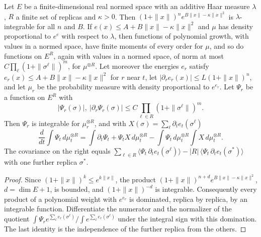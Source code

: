 \begin{lemma}\label{lem:sg-tal:st-confined}
  \leanok
Let $E$ be a finite-dimensional real normed space with an additive Haar measure $\lambda$, $R$ a finite set of
replicas and $\kappa>0$. Then $(1+\|x\|)^ne^{B\|x\|-\kappa\|x\|^2}$ is $\lambda$-integrable for all $n$ and $B$.
If $e(x)\le A+B\|x\|-\kappa\|x\|^2$ and $\mu$ has density proportional to $e^{e}$ with respect to $\lambda$, then
functions of polynomial growth, with values in a normed space, have finite moments of every order for $\mu$,
and so do functions on $E^R$, again with values in a normed space, of norm at most
$C\prod_{\ell}(1+\|\sigma^\ell\|)^m$, for $\mu^{\otimes R}$.
Let moreover the energies $e_r$ satisfy $e_r(x)\le A+B\|x\|-\kappa\|x\|^2$ for $r$ near $t$, let
$|\partial_re_r(x)|\le L(1+\|x\|)^n$, and let $\mu_r$ be the probability measure with density proportional to
$e^{e_r}$. Let $\Psi_r$ be a function on $E^R$ with
\[
|\Psi_r(\sigma)|,\ |\partial_r\Psi_r(\sigma)|\le C\prod_{\ell\in R}(1+\|\sigma^\ell\|)^m .
\]
Then $\Psi_r$ is integrable for $\mu_r^{\otimes R}$, and with $X(\sigma)=\sum_\ell\partial_te_t(\sigma^\ell)$
\[
\frac d{dt}\int\Psi_t\,d\mu_t^{\otimes R}
=\int\partial_t\Psi_t+\Psi_tX\,d\mu_t^{\otimes R}-\int\Psi_t\,d\mu_t^{\otimes R}\int X\,d\mu_t^{\otimes R}.
\]
The covariance on the right equals
$\sum_{\ell\in R}\langle\Psi_t\,\partial_te_t(\sigma^\ell)\rangle-|R|\,\langle\Psi_t\,\partial_te_t(\sigma^{*})\rangle$
with one further replica $\sigma^{*}$.
\end{lemma}
\begin{proof}
  \leanok
Since $(1+\|x\|)^k\le e^{k\|x\|}$, the product $(1+\|x\|)^{n+d}e^{B\|x\|-\kappa\|x\|^2}$, $d=\dim E+1$, is bounded,
and $(1+\|x\|)^{-d}$ is integrable. Consequently every product of a polynomial weight with $e^{e_r}$ is dominated,
replica by replica, by an integrable function. Differentiate the numerator and the normalizer of the
quotient $\int\Psi_re^{\sum_\ell e_r(\sigma^\ell)}\big/\int e^{\sum_\ell e_r(\sigma^\ell)}$ under the integral
sign with this domination. The last identity is the independence of the further replica from the others.
\end{proof}

